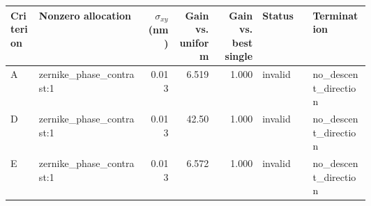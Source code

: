 \begin{tabular}{l p{0.30\linewidth} r r r p{0.14\linewidth} p{0.16\linewidth}}
\toprule
Criterion & Nonzero allocation & $\sigma_{xy}$ (nm) & Gain vs. uniform & Gain vs. best single & Status & Termination \\
\midrule
A & zernike\_phase\_contrast:1 & 0.013 & 6.519 & 1.000 & invalid & no\_descent\_direction \\
D & zernike\_phase\_contrast:1 & 0.013 & 42.50 & 1.000 & invalid & no\_descent\_direction \\
E & zernike\_phase\_contrast:1 & 0.013 & 6.572 & 1.000 & invalid & no\_descent\_direction \\
\bottomrule
\end{tabular}
